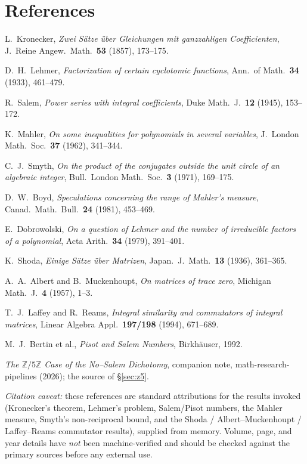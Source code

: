 \documentclass[11pt]{article}
\theoremstyle{definition}
\theoremstyle{remark}
\newcommand{\Z}{\mathbb{Z}}
\newcommand{\Zmod}[1]{\Z/#1\Z}
\begin{document}
\section*{References}
\small
\begin{enumerate}[label={[\arabic*]},leftmargin=2.2em,nosep]
  \item L.~Kronecker, \emph{Zwei S\"atze \"uber Gleichungen mit ganzzahligen Coefficienten},
        J.~Reine Angew.~Math.\ \textbf{53} (1857), 173--175.
  \item D.~H.~Lehmer, \emph{Factorization of certain cyclotomic functions},
        Ann.~of Math.\ \textbf{34} (1933), 461--479.
  \item R.~Salem, \emph{Power series with integral coefficients},
        Duke Math.~J.\ \textbf{12} (1945), 153--172.
  \item K.~Mahler, \emph{On some inequalities for polynomials in several variables},
        J.~London Math.~Soc.\ \textbf{37} (1962), 341--344.
  \item C.~J.~Smyth, \emph{On the product of the conjugates outside the unit circle of an
        algebraic integer}, Bull.~London Math.~Soc.\ \textbf{3} (1971), 169--175.
  \item D.~W.~Boyd, \emph{Speculations concerning the range of Mahler's measure},
        Canad.~Math.~Bull.\ \textbf{24} (1981), 453--469.
  \item E.~Dobrowolski, \emph{On a question of Lehmer and the number of irreducible factors of
        a polynomial}, Acta Arith.\ \textbf{34} (1979), 391--401.
  \item K.~Shoda, \emph{Einige S\"atze \"uber Matrizen}, Japan.\ J.\ Math.\ \textbf{13} (1936),
        361--365.
  \item A.~A.~Albert and B.~Muckenhoupt, \emph{On matrices of trace zero},
        Michigan Math.~J.\ \textbf{4} (1957), 1--3.
  \item T.~J.~Laffey and R.~Reams, \emph{Integral similarity and commutators of integral
        matrices}, Linear Algebra Appl.\ \textbf{197/198} (1994), 671--689.
  \item M.~J.~Bertin et al., \emph{Pisot and Salem Numbers}, Birkh\"auser, 1992.
  \item \emph{The $\Zmod5$ Case of the No--Salem Dichotomy}, companion note,
        math-research-pipelines (2026); the source of \S\ref{sec:z5}.
\end{enumerate}
\smallskip
\noindent\textit{Citation caveat:} these references are standard attributions for the results
invoked (Kronecker's theorem, Lehmer's problem, Salem/Pisot numbers, the Mahler measure,
Smyth's non-reciprocal bound, and the Shoda / Albert--Muckenhoupt / Laffey--Reams commutator
results), supplied from memory. Volume, page, and year details have \emph{not} been
machine-verified and should be checked against the primary sources before any external use.
\end{document}
